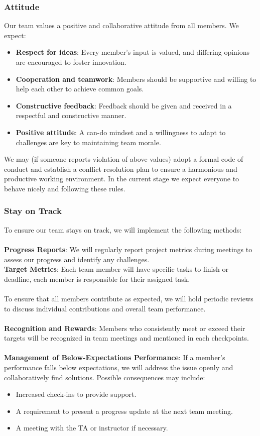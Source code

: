 \documentclass{article}
\begin{document}
\subsubsection*{Attitude}

Our team values a positive and collaborative attitude from all members. We expect:
\begin{itemize}
    \item \textbf{Respect for ideas}: Every member's input is valued, and differing opinions are encouraged to foster innovation.
    \item \textbf{Cooperation and teamwork}: Members should be supportive and willing to help each other to achieve common goals.
    \item \textbf{Constructive feedback}: Feedback should be given and received in a respectful and constructive manner.
    \item \textbf{Positive attitude}: A can-do mindset and a willingness to adapt to challenges are key to maintaining team morale.
\end{itemize}
We may (if someone reports violation of above values) adopt a formal code of conduct and establish a conflict resolution plan to ensure a harmonious and productive working environment. In the current stage we expect everyone to behave nicely and following these rules.

\subsubsection*{Stay on Track}

To ensure our team stays on track, we will implement the following methods:\\\\
\textbf{Progress Reports}: We will regularly report project metrics during meetings to assess our progress and identify any challenges.\\
\textbf{Target Metrics}: Each team member will have specific tasks to finish or deadline, each member is responsible for their assigned task.\\\\
To ensure that all members contribute as expected, we will hold periodic reviews to discuss individual contributions and overall team performance. \\\\
\textbf{Recognition and Rewards}: Members who consistently meet or exceed their targets will be recognized in team meetings and mentioned in each checkpoints.\\\\
\textbf{Management of Below-Expectations Performance}: If a member's performance falls below expectations, we will address the issue openly and collaboratively find solutions. Possible consequences may include:
\begin{itemize}
    \item Increased check-ins to provide support.
    \item A requirement to present a progress update at the next team meeting.
    \item A meeting with the TA or instructor if necessary.
\end{itemize}
\end{document}
